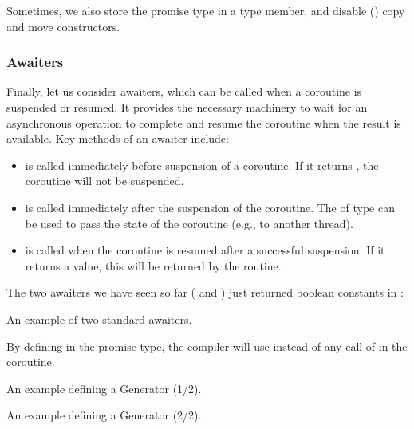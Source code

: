 \begin{itemize}
\begin{end}
Sometimes, we also store the promise type in a  type member, and disable () copy and move constructors. 

\subsubsection{Awaiters}

Finally, let us consider awaiters, which can be called when a coroutine is suspended or resumed. It provides the necessary machinery to wait for an asynchronous operation to complete and resume the coroutine when the result is available.
Key methods of an awaiter include:
\begin{itemize}
\item {} is called immediately before suspension of a coroutine. If it returns , the coroutine will not be suspended. 
\item {} is called immediately after the suspension of the coroutine. The  of type  can be used to pass the state of the coroutine (e.g., to another thread). 
\item {} is called when the coroutine is resumed after a successful suspension. If it returns a value, this will be returned by the  routine. 
\end{itemize}
The two awaiters we have seen so far ( and ) just returned boolean constants in :

\raggedbottom
\begin{codebox}[]{\href{https://godbolt.org/z/sK884T7hh}{\ExternalLink}}
\footnotesize An example of two standard awaiters.
\tcblower
{}
\end{codebox}

By defining  in the promise type, the compiler will use  instead of any call of  in the coroutine. 

\raggedbottom
\begin{codebox}[]{\href{https://godbolt.org/z/b5a94YeKx}{\ExternalLink}}
\footnotesize An example defining a Generator (1/2).
\tcblower
{}
\end{codebox}

\raggedbottom
\begin{codebox}[]{\href{https://godbolt.org/z/b5a94YeKx}{\ExternalLink}}
\footnotesize An example defining a Generator (2/2).
\tcblower
{}
\end{codebox}


\end{end}
\end{itemize}
